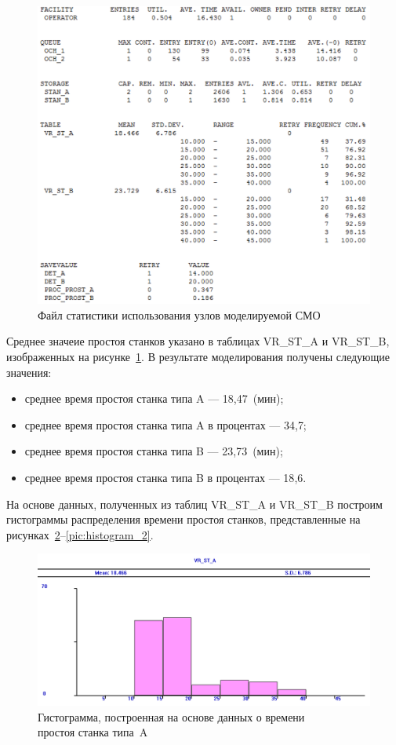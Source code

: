 \newpage

\begin{figure}[h!]
  \centering
  \includegraphics[width=0.8\linewidth]{pic/report_3}
  \caption{Файл статистики использования узлов моделируемой СМО}
  \label{pic:report_3}
\end{figure}

Среднее значеие простоя станков указано в таблицах VR\_ST\_A и VR\_ST\_B,
изображенных на рисунке~\ref{pic:report_3}. В результате моделирования получены
следующие значения:

\begin{itemize}
  \item среднее время простоя станка типа A --- 18{,}47~(мин);
  \item среднее время простоя станка типа A в процентах --- 34{,}7;
  \item среднее время простоя станка типа B --- 23{,}73~(мин);
  \item среднее время простоя станка типа B в процентах --- 18{,}6.
\end{itemize}

\newpage

На основе данных, полученных из таблиц VR\_ST\_A и VR\_ST\_B построим
гистограммы распределения времени простоя станков, представленные
на рисунках~\ref{pic:histogram_1}--\ref{pic:histogram_2}.

\begin{figure}[h!]
  \centering
  \includegraphics[width=0.8\linewidth]{pic/histogram_1}
  \caption{Гистограмма, построенная на основе данных о времени \\
    простоя станка типа~A}
  \label{pic:histogram_1}
\end{figure}

